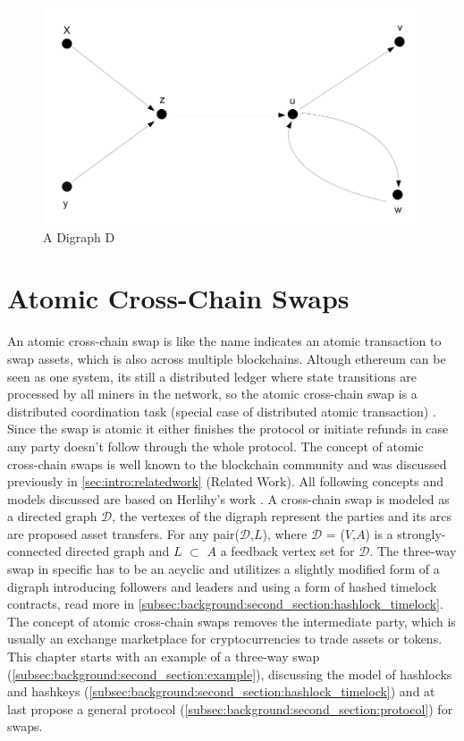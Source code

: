 \begin{figure}[h]
	\includegraphics[width=0.6\paperwidth]{adigraphd}	%
	\caption{A Digraph D}
	\label{fig:a_digraph_d}
\end{figure}

\clearpage

\section{Atomic Cross-Chain Swaps}
\label{sec:background:fifth_section}
An atomic cross-chain swap is like the name indicates an atomic transaction to swap assets, which is also across multiple blockchains. Altough ethereum can be seen as one system, its still a distributed ledger where state transitions are processed by all miners in the network, so the atomic cross-chain swap is a distributed coordination task (special case of distributed atomic transaction) \cite{weikum2001transactional}. Since the swap is atomic it either finishes the protocol or initiate refunds in case any party doesn't follow through the whole protocol. The concept of atomic cross-chain swaps is well known to the blockchain community and was discussed previously in \autoref{sec:intro:relatedwork} (Related Work). All following concepts and models discussed are based on Herlihy's work \cite{herlihy2018atomic}. A cross-chain swap is modeled as a directed graph $\mathcal{D}$, the vertexes of the digraph represent the parties and its arcs are proposed asset transfers. For any pair($\mathcal{D}$,$L$), where $\mathcal{D}$ = ($V$,$A$) is a strongly-connected directed graph and $L$ $\subset$ $A$ a feedback vertex set for $\mathcal{D}$. The three-way swap in specific has to be an acyclic and utilitizes a slightly modified form of a digraph introducing followers and leaders and using a form of hashed timelock contracts, read more in \autoref{subsec:background:second_section:hashlock_timelock}. The concept of atomic cross-chain swaps removes the intermediate party, which is usually an exchange marketplace for cryptocurrencies to trade assets or tokens. This chapter starts with an example of a three-way swap (\autoref{subsec:background:second_section:example}), discussing the model of hashlocks and hashkeys (\autoref{subsec:background:second_section:hashlock_timelock}) and at last propose a general protocol (\autoref{subsec:background:second_section:protocol}) for swaps.

